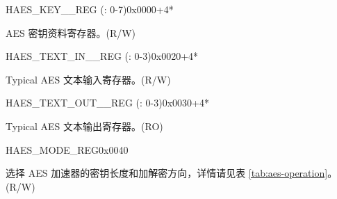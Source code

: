 \begin{register}{H}{AES\_KEY\_\_REG (: 0-7)}{0x0000+4*}\label{regdesc:AESKEYnREG}
%
\regnewline%
\begin{regdesc}\begin{reglist}
\item [AES\_KEY\_\regindex{n}\_REG (\regindex{n}: 0-7)]AES 密钥资料寄存器。(R/W)
\end{reglist}\end{regdesc}
\end{register}

\begin{register}{H}{AES\_TEXT\_IN\_\_REG (: 0-3)}{0x0020+4*}\label{regdesc:AESTEXTINnREG}
%
\regnewline%
\begin{regdesc}\begin{reglist}
\item [AES\_TEXT\_IN\_\regindex{m}\_REG (\regindex{m}: 0-3)] Typical AES 文本输入寄存器。(R/W)
\end{reglist}\end{regdesc}
\end{register}


\begin{register}{H}{AES\_TEXT\_OUT\_\_REG (: 0-3)}{0x0030+4*}\label{regdesc:AESTEXTOUTnREG}
%
\regnewline%
\begin{regdesc}\begin{reglist}
\item [AES\_TEXT\_OUT\_\regindex{m}\_REG (\regindex{m}: 0-3)] Typical AES 文本输出寄存器。(RO)
\end{reglist}\end{regdesc}
\end{register}


\begin{register}{H}{AES\_MODE\_REG}{0x0040}\label{regdesc:AESMODEREG}
%
%
\regnewline%
\begin{regdesc}\begin{reglist}
\item [AES\_MODE] 选择 AES 加速器的密钥长度和加解密方向，详情请见表 \ref{tab:aes-operation}。(R/W)
\end{reglist}\end{regdesc}
\end{register}


